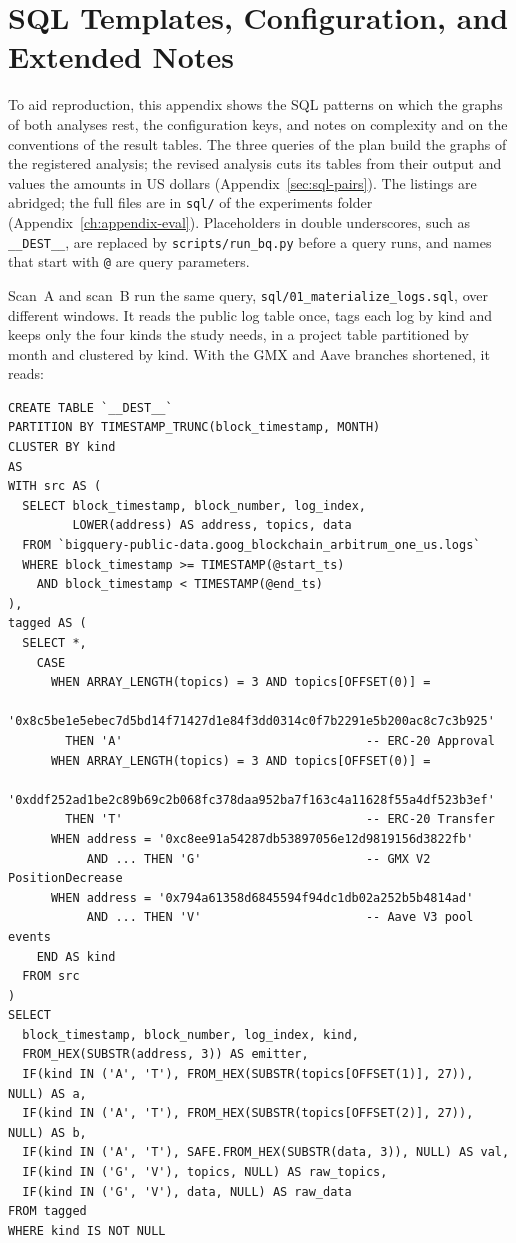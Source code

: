 \section{SQL Templates, Configuration, and Extended Notes}
\label{ch:appendix-sql}

To aid reproduction, this appendix shows the SQL patterns on which the graphs of both analyses rest, the configuration keys, and notes on complexity and on the conventions of the result tables. The three queries of the plan build the graphs of the registered analysis; the revised analysis cuts its tables from their output and values the amounts in US dollars (Appendix~\ref{sec:sql-pairs}). The listings are abridged; the full files are in \texttt{sql/} of the experiments folder (Appendix~\ref{ch:appendix-eval}). Placeholders in double underscores, such as \texttt{\_\_DEST\_\_}, are replaced by \texttt{scripts/run\_bq.py} before a query runs, and names that start with \texttt{@} are query parameters.


Scan~A and scan~B run the same query, \texttt{sql/01\_materialize\_logs.sql}, over different windows. It reads the public log table once, tags each log by kind and keeps only the four kinds the study needs, in a project table partitioned by month and clustered by kind. With the GMX and Aave branches shortened, it reads:

\begin{verbatim}
CREATE TABLE `__DEST__`
PARTITION BY TIMESTAMP_TRUNC(block_timestamp, MONTH)
CLUSTER BY kind
AS
WITH src AS (
  SELECT block_timestamp, block_number, log_index,
         LOWER(address) AS address, topics, data
  FROM `bigquery-public-data.goog_blockchain_arbitrum_one_us.logs`
  WHERE block_timestamp >= TIMESTAMP(@start_ts)
    AND block_timestamp < TIMESTAMP(@end_ts)
),
tagged AS (
  SELECT *,
    CASE
      WHEN ARRAY_LENGTH(topics) = 3 AND topics[OFFSET(0)] =
        '0x8c5be1e5ebec7d5bd14f71427d1e84f3dd0314c0f7b2291e5b200ac8c7c3b925'
        THEN 'A'                                  -- ERC-20 Approval
      WHEN ARRAY_LENGTH(topics) = 3 AND topics[OFFSET(0)] =
        '0xddf252ad1be2c89b69c2b068fc378daa952ba7f163c4a11628f55a4df523b3ef'
        THEN 'T'                                  -- ERC-20 Transfer
      WHEN address = '0xc8ee91a54287db53897056e12d9819156d3822fb'
           AND ... THEN 'G'                       -- GMX V2 PositionDecrease
      WHEN address = '0x794a61358d6845594f94dc1db02a252b5b4814ad'
           AND ... THEN 'V'                       -- Aave V3 pool events
    END AS kind
  FROM src
)
SELECT
  block_timestamp, block_number, log_index, kind,
  FROM_HEX(SUBSTR(address, 3)) AS emitter,
  IF(kind IN ('A', 'T'), FROM_HEX(SUBSTR(topics[OFFSET(1)], 27)), NULL) AS a,
  IF(kind IN ('A', 'T'), FROM_HEX(SUBSTR(topics[OFFSET(2)], 27)), NULL) AS b,
  IF(kind IN ('A', 'T'), SAFE.FROM_HEX(SUBSTR(data, 3)), NULL) AS val,
  IF(kind IN ('G', 'V'), topics, NULL) AS raw_topics,
  IF(kind IN ('G', 'V'), data, NULL) AS raw_data
FROM tagged
WHERE kind IS NOT NULL
\end{verbatim}

